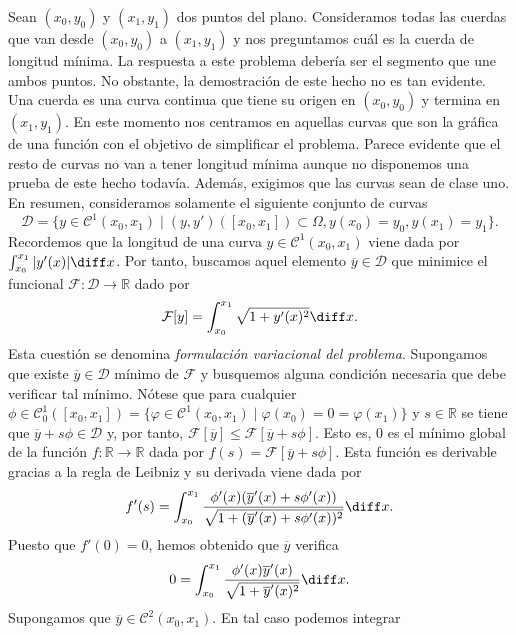 \documentclass{article}
\begin{document}
\begin{ex} \label{ex:intro} Sean $(x_0, y_0)$ y $(x_1, y_1)$ dos
  puntos del plano. Consideramos todas las cuerdas que van desde $(x_0, y_0)$ a $(x_1, y_1)$ y nos
  preguntamos cuál es la cuerda de longitud mínima. La respuesta a este problema debería ser el
  segmento que une ambos puntos. No obstante, la demostración de este hecho no es tan evidente. Una
  cuerda es una curva continua que tiene su origen en $(x_0, y_0)$ y termina en $(x_1, y_1)$. En
  este momento nos centramos en aquellas curvas que son la gráfica de una función con el objetivo de
  simplificar el problema. Parece evidente que el resto de curvas no van a tener longitud mínima
  aunque no disponemos una prueba de este hecho todavía. Además, exigimos que las curvas sean de
  clase uno. En resumen, consideramos solamente el siguiente conjunto de curvas
  \[\mathcal{D} = \{y \in \mathcal{C}^1(x_0, x_1)\mid (y, y')([x_0, x_1]) \subset \Omega, y(x_0) =
    y_0, y(x_1) = y_1\}.\] Recordemos que la longitud de una curva $y \in \mathcal{C}^1(x_0, x_1)$
  viene dada por $\int_{x_0}^{x_1} |y'(x)| \diff x$. Por tanto, buscamos aquel elemento
  $\overline{y} \in \mathcal{D}$ que minimice el funcional $\mathcal{F}\colon \mathcal{D} \to \mathbb{R}$
  dado por
  \[\mathcal{F}[y] = \int_{x_0}^{x_1} \sqrt{1 + y'(x)^2} \diff x.\]
  Esta cuestión se denomina \emph{formulación variacional del problema}. Supongamos que existe
  $\overline{y} \in \mathcal{D}$ mínimo de $\mathcal{F}$ y busquemos alguna condición necesaria que
  debe verificar tal mínimo. Nótese que para cualquier
  $\phi \in \mathcal{C}^1_0([x_0, x_1]) = \{\varphi \in \mathcal{C}^1(x_0, x_1)\mid \varphi(x_0) = 0
  = \varphi(x_1)\}$ y $s \in \mathbb{R}$ se tiene que $\overline{y} + s \phi \in \mathcal{D}$ y, por
  tanto, $\mathcal{F}[\overline{y}] \le \mathcal{F}[\overline{y} + s \phi]$. Esto es, $0$ es el
  mínimo global de la función $f\colon \mathbb{R} \to \mathbb{R}$ dada por
  $f(s) = \mathcal{F}[\overline{y} + s \phi]$. Esta función es derivable gracias a la regla de
  Leibniz y su derivada viene dada por
  \[f'(s) = \int_{x_0}^{x_1} \frac{\phi'(x)(\overline{y}'(x) + s \phi'(x))}{\sqrt{1 +
        (\overline{y}'(x) + s \phi'(x))^2}} \diff x.\] Puesto que $f'(0) = 0$, hemos obtenido que
  $\overline{y}$ verifica
  \begin{equation} \label{eq:ex:fdp} 0 = \int_{x_0}^{x_1} \frac{\phi'(x) \overline{y}'(x)}{\sqrt{1 +
        \overline{y}'(x)^2}} \diff x.
  \end{equation}
  Supongamos que $\overline{y} \in \mathcal{C}^2(x_0, x_1)$. En tal caso podemos integrar

\end{ex}
\end{document}
